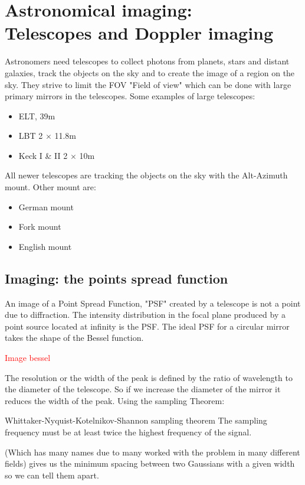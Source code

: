 \section{Astronomical imaging: \\ Telescopes and Doppler imaging}
Astronomers need telescopes to collect photons from planets, stars and distant galaxies, track the objects on the sky and to create the image of a region on the sky. They strive to limit the FOV "Field of view" which can be done with large primary mirrors in the telescopes. Some examples of large telescopes:

\begin{itemize}
	\item ELT, 39m 
	\item LBT 2 $\times$ 11.8m
	\item Keck I \& II 2 $\times$ 10m 
\end{itemize}

All newer telescopes are tracking the objects on the sky with the Alt-Azimuth mount. Other mount are: 
\begin{itemize}
	\item German mount
	\item Fork mount
	\item English mount
\end{itemize}

	\subsection*{Imaging: the points spread function}
	An image of a Point Spread Function, "PSF" created by a telescope is not a point due to diffraction. The intensity distribution in the focal plane produced by a point source located at infinity is the PSF. The ideal PSF for a circular mirror takes the shape of the Bessel function.

	\textcolor{red}{Image bessel} 

	The resolution or the width of the peak is defined by the ratio of wavelength to the diameter of the telescope. So if we increase the diameter of the mirror it reduces the width of the peak. Using the sampling Theorem: 

		\begin{example}{Whittaker-Nyquist-Kotelnikov-Shannon sampling theorem}
			The sampling frequency must be at least twice the highest frequency of the signal.
		\end{example}	 

	 (Which has many names due to many worked with the problem in many different fields) gives us the minimum spacing between two Gaussians with a given width so we can tell them apart.

